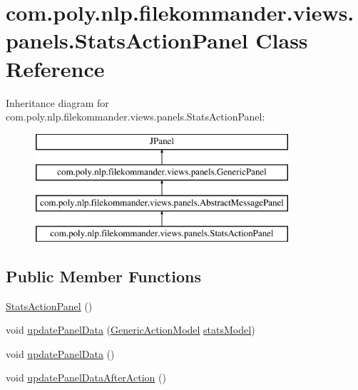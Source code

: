 \hypertarget{classcom_1_1poly_1_1nlp_1_1filekommander_1_1views_1_1panels_1_1_stats_action_panel}{\section{com.\-poly.\-nlp.\-filekommander.\-views.\-panels.\-Stats\-Action\-Panel Class Reference}
\label{classcom_1_1poly_1_1nlp_1_1filekommander_1_1views_1_1panels_1_1_stats_action_panel}
}
Inheritance diagram for com.\-poly.\-nlp.\-filekommander.\-views.\-panels.\-Stats\-Action\-Panel\-:\begin{figure}[H]
\begin{center}
\leavevmode
\includegraphics[height=4.000000cm]{classcom_1_1poly_1_1nlp_1_1filekommander_1_1views_1_1panels_1_1_stats_action_panel}
\end{center}
\end{figure}
\subsection*{Public Member Functions}
\begin{DoxyCompactItemize}
\item 
\hyperlink{classcom_1_1poly_1_1nlp_1_1filekommander_1_1views_1_1panels_1_1_stats_action_panel_a2b841c6de0cfb7cd6520f01ef22e99c9}{Stats\-Action\-Panel} ()
\item 
void \hyperlink{classcom_1_1poly_1_1nlp_1_1filekommander_1_1views_1_1panels_1_1_stats_action_panel_a3feebd3516f922f6dfb69a2b20dd49cc}{update\-Panel\-Data} (\hyperlink{interfacecom_1_1poly_1_1nlp_1_1filekommander_1_1views_1_1models_1_1_generic_action_model}{Generic\-Action\-Model} \hyperlink{classcom_1_1poly_1_1nlp_1_1filekommander_1_1views_1_1panels_1_1_stats_action_panel_aaefc874fb6203949c9a759791eaf06b3}{stats\-Model})
\item 
void \hyperlink{classcom_1_1poly_1_1nlp_1_1filekommander_1_1views_1_1panels_1_1_stats_action_panel_ad76ec2decc6f9745da5af0b3389fe98a}{update\-Panel\-Data} ()
\item 
void \hyperlink{classcom_1_1poly_1_1nlp_1_1filekommander_1_1views_1_1panels_1_1_stats_action_panel_a2c9b149207152e5d1570c62172fd8823}{update\-Panel\-Data\-After\-Action} ()
\end{DoxyCompactItemize}
